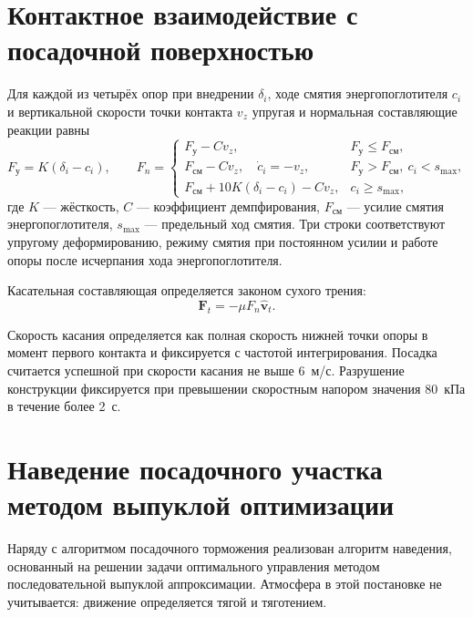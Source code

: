 \documentclass[11pt,a4paper]{article}
\newcommand{\vect}[1]{\bm{#1}}
\begin{document}
\section{Контактное взаимодействие с посадочной поверхностью}

Для каждой из четырёх опор при внедрении $\delta_i$, ходе смятия
энергопоглотителя $c_i$ и вертикальной скорости точки контакта $v_z$ упругая и
нормальная составляющие реакции равны
\begin{equation}
F_{\text{у}} = K\left(\delta_i - c_i\right),
\qquad
F_n = \begin{cases}
F_{\text{у}} - C v_z, & F_{\text{у}}\le F_{\text{см}},\\[1ex]
F_{\text{см}} - C v_z,\quad \dot c_i = -v_z,
 & F_{\text{у}}>F_{\text{см}},\ c_i<s_{\max},\\[1ex]
F_{\text{см}} + 10K\left(\delta_i-c_i\right) - C v_z, & c_i\ge s_{\max},
\end{cases}
\end{equation}
где $K$ — жёсткость, $C$ — коэффициент демпфирования, $F_{\text{см}}$ — усилие
смятия энергопоглотителя, $s_{\max}$ — предельный ход смятия. Три строки
соответствуют упругому деформированию, режиму смятия при постоянном усилии и
работе опоры после исчерпания хода энергопоглотителя.

Касательная составляющая определяется законом сухого трения:
\begin{equation}
\vect{F}_t = -\mu F_n \hat{\vect{v}}_t .
\end{equation}

Скорость касания определяется как полная скорость нижней точки опоры в момент
первого контакта и фиксируется с частотой интегрирования. Посадка считается
успешной при скорости касания не выше 6~м/с. Разрушение конструкции фиксируется
при превышении скоростным напором значения 80~кПа в течение более 2~с.

\section{Наведение посадочного участка методом выпуклой оптимизации}
\label{sec:pdg}

Наряду с алгоритмом посадочного торможения реализован алгоритм наведения,
основанный на решении задачи оптимального управления методом последовательной
выпуклой аппроксимации. Атмосфера в этой постановке не учитывается: движение
определяется тягой и тяготением.
\end{document}
